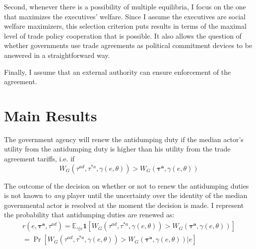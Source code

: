 \documentclass[10pt]{article}
\newcommand{\ve}{\theta}
\newcommand{\expect}{\mathbb{E}}
\newcommand{\bta}{\bm{\tau^a}}
\newcommand{\tad}{\tau^{ad}}
\newcommand{\ga}{\gamma}
\begin{document}
Second, whenever there is a possibility of multiple equilibria, I focus on the one that maximizes the executives' welfare. Since I assume the executives are social welfare maximizers, this selection criterion puts results in terms of the maximal level of trade policy cooperation that is possible. It also allows the question of whether governments use trade agreements as political commitment devices to be answered in a straightforward way.

Finally, I assume that an external authority can ensure enforcement of the agreement.


\section{Main Results}
\label{sec:main}

The government agency will renew the antidumping duty if the median actor's utility from the antidumping duty is higher than his utility from the trade agreement tariffs, i.e. if
\begin{equation}
  W_G(\tad,\tau^{*a},\ga(e,\ve)) > W_G\left(\bta,\ga(e,\ve)\right)
  \label{eq:lwcg}
\end{equation}
  
The outcome of the decision on whether or not to renew the antidumping duties is not known to \textit{any} player until the uncertainty over the identity of the median governmental actor is resolved at the moment the decision is made. I represent the probability that antidumping duties are renewed as:
\begin{multline}
  r(e,\bta,\tad) = \expect_{\ga|e} \bm{1} [ W_G(\tad,\tau^{*a},\ga(e,\ve)) > W_G\left(\bta,\ga(e,\ve)\right) ] \\ = \Pr [ W_G(\tad,\tau^{*a},\ga(e,\ve)) > W_G\left(\bta,\ga(e,\ve)\right) | e]
  \label{eq:b}
\end{multline}
\end{document}
